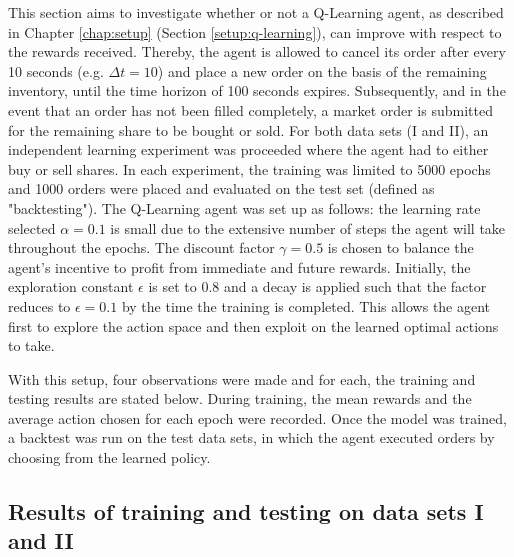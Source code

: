 This section aims to investigate whether or not a Q-Learning agent, as described in Chapter \ref{chap:setup} (Section \ref{setup:q-learning}), can improve with respect to the rewards received.
Thereby, the agent is allowed to cancel its order after every 10 seconds (e.g. $\Delta{t}=10$) and place a new order on the basis of the remaining inventory, until the time horizon of 100 seconds expires.
Subsequently, and in the event that an order has not been filled completely, a market order is submitted for the remaining share to be bought or sold.
For both data sets (I and II), an independent learning experiment was proceeded where the agent had to either buy or sell shares.
In each experiment, the training was limited to 5000 epochs and 1000 orders were placed and evaluated on the test set (defined as "backtesting").
The Q-Learning agent was set up as follows:
the learning rate selected $\alpha=0.1$ is small due to the extensive number of steps the agent will take throughout the epochs.
The discount factor $\gamma=0.5$ is chosen to balance the agent's incentive to profit from immediate and future rewards.
Initially, the exploration constant $\epsilon$ is set to 0.8 and a decay is applied such that the factor reduces to $\epsilon=0.1$ by the time the training is completed.
This allows the agent first to explore the action space and then exploit on the learned optimal actions to take.

With this setup, four observations were made and for each, the training and testing results are stated below.
During training, the mean rewards and the average action chosen for each epoch were recorded.
Once the model was trained, a backtest was run on the test data sets, in which the agent executed orders by choosing from the learned policy.

\subsection{Results of training and testing on data sets I and II}

